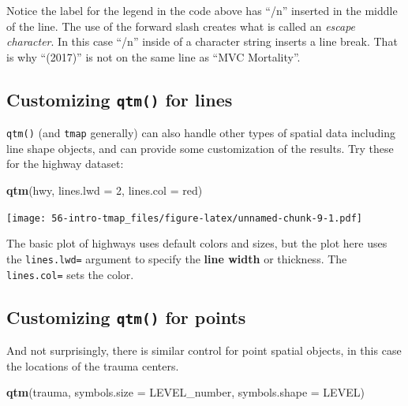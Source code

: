 \documentclass[
]{book}
\newenvironment{Shaded}{\begin{snugshade}}{\end{snugshade}}
\newcommand{\AttributeTok}[1]{\textcolor[rgb]{0.13,0.29,0.53}{#1}}
\newcommand{\DecValTok}[1]{\textcolor[rgb]{0.00,0.00,0.81}{#1}}
\newcommand{\FunctionTok}[1]{\textcolor[rgb]{0.13,0.29,0.53}{\textbf{#1}}}
\newcommand{\NormalTok}[1]{#1}
\newcommand{\StringTok}[1]{\textcolor[rgb]{0.31,0.60,0.02}{#1}}
\newenvironment{rmdnote}[1]
  {
  \begin{itemize}
  \renewcommand{\labelitemi}{
    \raisebox{-.7\height}[0pt][0pt]{
      {\setkeys{Gin}{width=3em,keepaspectratio}\texttt{[image: images/\#1]}}
    }
  }
  \setlength{\fboxsep}{1em}
  \begin{note}
  \item
  }
  {
  \end{note}
  \end{itemize}
  }
\begin{document}
\begin{rmdnote}{note}
Notice the label for the legend in the code above has ``/n'' inserted in the middle of the line. The use of the forward slash creates what is called an \emph{escape character}. In this case ``/n'' inside of a character string inserts a line break. That is why ``(2017)'' is not on the same line as ``MVC Mortality''.

\end{rmdnote}

\hypertarget{customizing-qtm-for-lines}{%
\subsection{\texorpdfstring{Customizing \texttt{qtm()} for lines}{Customizing qtm() for lines}}\label{customizing-qtm-for-lines}}

\texttt{qtm()} (and \texttt{tmap} generally) can also handle other types of spatial data including line shape objects, and can provide some customization of the results. Try these for the highway dataset:

\begin{Shaded}
\begin{Highlighting}[]
\FunctionTok{qtm}\NormalTok{(hwy, }
    \AttributeTok{lines.lwd =} \DecValTok{2}\NormalTok{, }
    \AttributeTok{lines.col =} \StringTok{\textquotesingle{}red\textquotesingle{}}\NormalTok{)}
\end{Highlighting}
\end{Shaded}

\texttt{[image: 56-intro-tmap\_files/figure-latex/unnamed-chunk-9-1.pdf]}

The basic plot of highways uses default colors and sizes, but the plot here uses the \texttt{lines.lwd=} argument to specify the \textbf{line width} or thickness. The \texttt{lines.col=} sets the color.

\hypertarget{customizing-qtm-for-points}{%
\subsection{\texorpdfstring{Customizing \texttt{qtm()} for points}{Customizing qtm() for points}}\label{customizing-qtm-for-points}}

And not surprisingly, there is similar control for point spatial objects, in this case the locations of the trauma centers.

\begin{Shaded}
\begin{Highlighting}[]
\FunctionTok{qtm}\NormalTok{(trauma,}
    \AttributeTok{symbols.size =} \StringTok{\textquotesingle{}LEVEL\_number\textquotesingle{}}\NormalTok{, }
    \AttributeTok{symbols.shape =} \StringTok{\textquotesingle{}LEVEL\textquotesingle{}}\NormalTok{)}
\end{Highlighting}
\end{Shaded}
\end{document}
